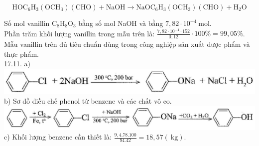 \documentclass[10pt]{article}
\begin{document}
$$
\mathrm{HOC}_{6} \mathrm{H}_{3}\left(\mathrm{OCH}_{3}\right)(\mathrm{CHO})+\mathrm{NaOH} \rightarrow \mathrm{NaOC}_{6} \mathrm{H}_{3}\left(\mathrm{OCH}_{3}\right)(\mathrm{CHO})+\mathrm{H}_{2} \mathrm{O}
$$

Số mol vanillin $\mathrm{C}_{8} \mathrm{H}_{8} \mathrm{O}_{3}$ bằng số mol NaOH và bằng $7,82 \cdot 10^{-4} \mathrm{~mol}$.\\
Phần trăm khối lượng vanillin trong mẫu trên là: $\frac{7,82 \cdot 10^{-4} \cdot 152}{0,12} \cdot 100 \%=99,05 \%$.\\
Mẫu vanillin trên đủ tiêu chuẩn dùng trong công nghiệp sản xuất dược phẩm và thực phẩm.\\
17.11. a)\\
\includegraphics[max width=\textwidth, center]{2025_10_23_052d3249fabea90c1e95g-26}\\
b) Sơ đồ điều chế phenol từ benzene và các chất vô co.\\
\includegraphics[max width=\textwidth, center]{2025_10_23_052d3249fabea90c1e95g-26(1)}\\
c) Khối lượng benzene cần thiết là: $\frac{9,4.78 .100}{94.42}=18,57(\mathrm{~kg})$.
\end{document}
